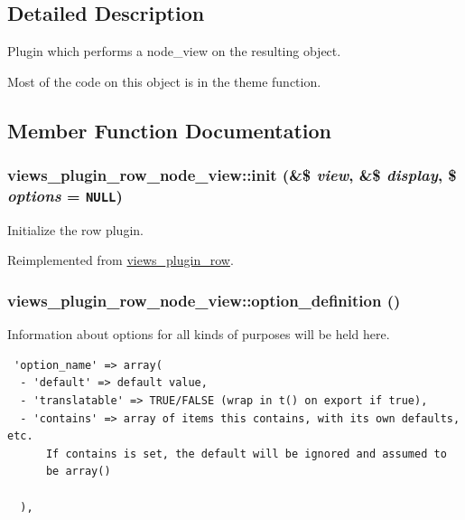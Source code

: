 \subsection{Detailed Description}
Plugin which performs a node\_\-view on the resulting object.

Most of the code on this object is in the theme function. 

\subsection{Member Function Documentation}
\hypertarget{classviews__plugin__row__node__view_3bb6fb204cefdab520d24765a8f916ba}{
\subsubsection[{init}]{\setlength{\rightskip}{0pt plus 5cm}views\_\-plugin\_\-row\_\-node\_\-view::init (\&\$ {\em view}, \/  \&\$ {\em display}, \/  \$ {\em options} = {\tt NULL})}}
\label{classviews__plugin__row__node__view_3bb6fb204cefdab520d24765a8f916ba}


Initialize the row plugin. 

Reimplemented from \hyperlink{classviews__plugin__row_bf02e5f51e907c5009edda15d997c161}{views\_\-plugin\_\-row}.\hypertarget{classviews__plugin__row__node__view_f489a0ff40c6b85382d9611cce0c509b}{
\subsubsection[{option\_\-definition}]{\setlength{\rightskip}{0pt plus 5cm}views\_\-plugin\_\-row\_\-node\_\-view::option\_\-definition ()}}
\label{classviews__plugin__row__node__view_f489a0ff40c6b85382d9611cce0c509b}


Information about options for all kinds of purposes will be held here. 

\begin{Code}\begin{verbatim} 'option_name' => array(
  - 'default' => default value,
  - 'translatable' => TRUE/FALSE (wrap in t() on export if true),
  - 'contains' => array of items this contains, with its own defaults, etc.
      If contains is set, the default will be ignored and assumed to
      be array()

  ),
\end{verbatim}
\end{Code}

